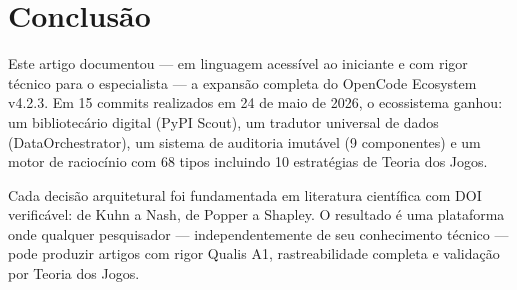 \documentclass[12pt,a4paper]{article}
\begin{document}
\section{Conclusão}

Este artigo documentou --- em linguagem acessível ao iniciante e com rigor técnico para o especialista --- a expansão completa do OpenCode Ecosystem v4.2.3. Em 15 commits realizados em 24 de maio de 2026, o ecossistema ganhou: um bibliotecário digital (PyPI Scout), um tradutor universal de dados (DataOrchestrator), um sistema de auditoria imutável (9 componentes) e um motor de raciocínio com 68 tipos incluindo 10 estratégias de Teoria dos Jogos.

Cada decisão arquitetural foi fundamentada em literatura científica com DOI verificável: de Kuhn a Nash, de Popper a Shapley. O resultado é uma plataforma onde qualquer pesquisador --- independentemente de seu conhecimento técnico --- pode produzir artigos com rigor Qualis A1, rastreabilidade completa e validação por Teoria dos Jogos.
\end{document}
